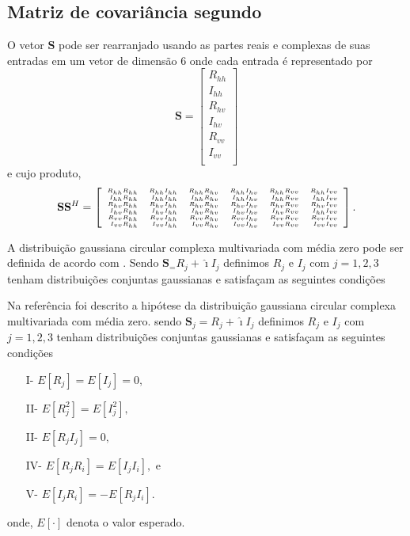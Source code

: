 \subsection{Matriz de covariância segundo \citet{good}}

O vetor $\mathbf{S}$ pode ser rearranjado usando as partes reais e complexas de suas entradas em um vetor de dimensão $6$ onde cada entrada é representado por
\begin{equation}
\mathbf{S} = \left[
\begin{array}{c}
	R_{hh}     \\
    I_{hh}     \\
	R_{hv}     \\
	I_{hv}     \\
    R_{vv}     \\
	I_{vv}     \\
\end{array}
\right]
\end{equation}
e cujo produto, 
\begin{equation*}
\tiny
\mathbf{S} \mathbf{S}^H= \left[
\begin{array}{rrrrrr}
	R_{hh}R_{hh}  & R_{hh}I_{hh} &R_{hh}R_{hv} & R_{hh}I_{hv} &R_{hh}R_{vv} &R_{hh}I_{vv} \\
    I_{hh}R_{hh}  & I_{hh}I_{hh} &I_{hh}R_{hv} & I_{hh}I_{hv} &I_{hh}R_{vv} &I_{hh}I_{vv} \\
	R_{hv}R_{hh}  & R_{hv}I_{hh} &R_{hv}R_{hv} & R_{hv}I_{hv} &R_{hv}R_{vv} &R_{hv}I_{vv} \\
	I_{hv}R_{hh}  & I_{hv}I_{hh} &I_{hv}R_{hv} & I_{hv}I_{hv} &I_{hv}R_{vv} &I_{hh}I_{vv} \\
    R_{vv}R_{hh}  & R_{vv}I_{hh} &R_{vv}R_{hv} & R_{vv}I_{hv} &R_{vv}R_{vv} &R_{vv}I_{vv} \\
	I_{vv}R_{hh}  & I_{vv}I_{hh} &I_{vv}R_{hv} & I_{vv}I_{hv} &I_{vv}R_{vv} &I_{vv}I_{vv} \\
\end{array}
\right].
\end{equation*}

A distribuição gaussiana circular complexa multivariada com média zero pode ser definida de acordo com \citet{goodman}. Sendo $\mathbf{S}_= R_j+\hat{\imath}I_j$ definimos $R_j$ e $I_j$ com $j=1,2,3$ tenham distribuições conjuntas gaussianas e satisfaçam as seguintes condições

Na referência \cite{good} foi descrito a hipótese da distribuição gaussiana circular complexa multivariada com média zero. sendo $\mathbf{S}_{j}= R_j+\hat{\imath}I_j$ definimos $R_j$ e $I_j$ com $j=1,2,3$ tenham distribuições conjuntas gaussianas e satisfaçam as seguintes condições  
\begin{itemize}
	\item[I-] $E[R_{j}]=E[I_{j}]=0,$
	\item[II-] $E[R_j^2]=E[I_j^2],$ 
	\item[II-] $E[R_jI_j]=0,$  
	\item[IV-] $E[R_jR_i]=E[I_jI_i],$ e 
	\item[V-] $E[I_jR_i]=-E[R_jI_i].$
\end{itemize}
onde, $E[\cdot]$ denota o valor esperado. 

